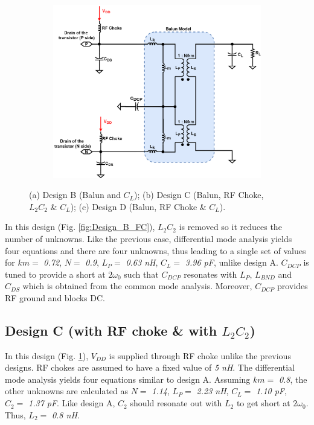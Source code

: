 \documentclass[conference]{IEEEtran}
\begin{document}
\begin{figure}[!t]
\begin{subfigure}{0.24\textwidth}
\caption{}
\label{fig:Design_C_FC}
\end{subfigure}
\begin{subfigure}{0.24\textwidth}
\includegraphics[width=1\textwidth]{Images/Design/Design_D_FC.png}
\caption{}
\label{fig:Design_D_FC}
\end{subfigure}
\caption{(a) Design B (Balun and $C_L$); (b) Design C (Balun, RF Choke, $L_2C_2$ \& $C_L$); (c) Design D (Balun, RF Choke \& $C_L$).}
\label{fig:Design_B_C_D}
\vspace{-0.25in}
\end{figure}

In this design (Fig. \ref{fig:Design_B_FC}), $L_2C_2$ is removed so it reduces the number of unknowns. Like the previous case, differential mode analysis yields four equations and there are four unknowns, thus leading to a single set of values for $km =$ \textit{0.72}, $N =$ \textit{0.9}, $L_P =$ \textit{0.63 nH}, $C_L =$ \textit{3.96 pF}, unlike design A. $C_{DCP}$ is tuned to provide a short at $2\omega_0$ such that $C_{DCP}$ resonates with $L_P$, $L_{BND}$ and $C_{DS}$ which is obtained from the common mode analysis. Moreover, $C_{DCP}$ provides RF ground and blocks DC.

\subsection{Design C (with RF choke \& with $L_2C_2$)}
In this design (Fig. \ref{fig:Design_C_FC}), $V_{DD}$ is supplied through RF choke unlike the previous designs. RF chokes are assumed to have a fixed value of \textit{5 nH}. The differential mode analysis yields four equations similar to design A. Assuming $km =$ \textit{0.8}, the other unknowns are calculated as $N =$ \textit{1.14}, $L_P =$ \textit{2.23 nH}, $C_L =$ \textit{1.10 pF}, $C_2 =$ \textit{1.37 pF}.
Like design A, $C_2$ should resonate out with $L_2$ to get short at $2\omega_0$. Thus, $L_2 =$ \textit{0.8 nH}. 
\end{document}
